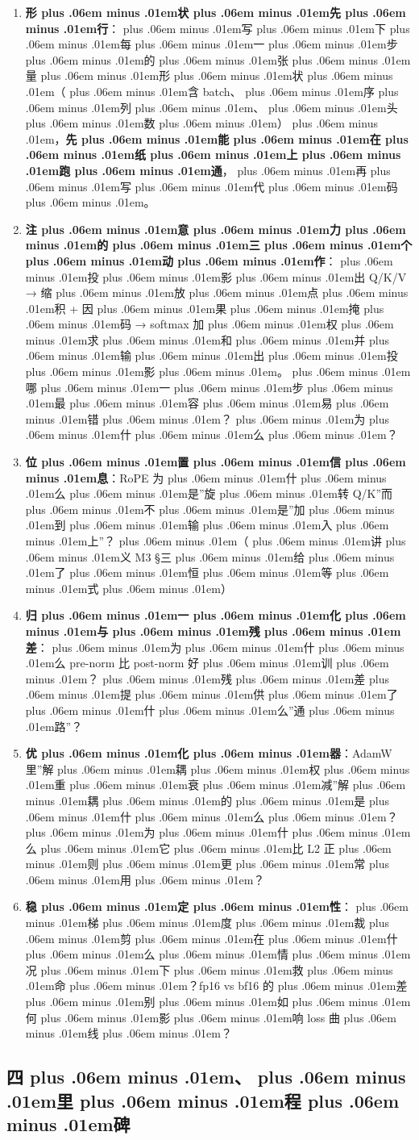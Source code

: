 \documentclass[
]{article}
\providecommand{\tightlist}{%
  \setlength{\itemsep}{0pt}\setlength{\parskip}{0pt}}
\def\zh#1{{\zhfont #1}}
\def\sym#1{{\symfont #1}}
\def\zhglue{\hskip0pt plus .06em minus .01em}
\begin{document}
\begin{enumerate}
\def\labelenumi{\arabic{enumi}.}
\tightlist
\item
  \textbf{\zh{形\zhglue 状\zhglue 先\zhglue 行}}\zh{：\zhglue 写\zhglue 下\zhglue 每\zhglue 一\zhglue 步\zhglue 的\zhglue 张\zhglue 量\zhglue 形\zhglue 状\zhglue （\zhglue 含} batch\zh{、\zhglue 序\zhglue 列\zhglue 、\zhglue 头\zhglue 数\zhglue ）\zhglue ，}\textbf{\zh{先\zhglue 能\zhglue 在\zhglue 纸\zhglue 上\zhglue 跑\zhglue 通}}\zh{，\zhglue 再\zhglue 写\zhglue 代\zhglue 码\zhglue 。}
\item
  \textbf{\zh{注\zhglue 意\zhglue 力\zhglue 的\zhglue 三\zhglue 个\zhglue 动\zhglue 作}}\zh{：\zhglue 投\zhglue 影\zhglue 出} Q/K/V \sym{→} \zh{缩\zhglue 放\zhglue 点\zhglue 积} + \zh{因\zhglue 果\zhglue 掩\zhglue 码} \sym{→} softmax \zh{加\zhglue 权\zhglue 求\zhglue 和\zhglue 并\zhglue 输\zhglue 出\zhglue 投\zhglue 影\zhglue 。\zhglue 哪\zhglue 一\zhglue 步\zhglue 最\zhglue 容\zhglue 易\zhglue 错\zhglue ？\zhglue 为\zhglue 什\zhglue 么\zhglue ？}
\item
  \textbf{\zh{位\zhglue 置\zhglue 信\zhglue 息}}\zh{：}RoPE \zh{为\zhglue 什\zhglue 么\zhglue 是}''\zh{旋\zhglue 转} Q/K''\zh{而\zhglue 不\zhglue 是}''\zh{加\zhglue 到\zhglue 输\zhglue 入\zhglue 上}''\zh{？\zhglue （\zhglue 讲\zhglue 义} M3 \sym{§}\zh{三\zhglue 给\zhglue 了\zhglue 恒\zhglue 等\zhglue 式\zhglue ）}
\item
  \textbf{\zh{归\zhglue 一\zhglue 化\zhglue 与\zhglue 残\zhglue 差}}\zh{：\zhglue 为\zhglue 什\zhglue 么} pre-norm \zh{比} post-norm \zh{好\zhglue 训\zhglue ？\zhglue 残\zhglue 差\zhglue 提\zhglue 供\zhglue 了\zhglue 什\zhglue 么}''\zh{通\zhglue 路}''\zh{？}
\item
  \textbf{\zh{优\zhglue 化\zhglue 器}}\zh{：}AdamW \zh{里}''\zh{解\zhglue 耦\zhglue 权\zhglue 重\zhglue 衰\zhglue 减}''\zh{解\zhglue 耦\zhglue 的\zhglue 是\zhglue 什\zhglue 么\zhglue ？\zhglue 为\zhglue 什\zhglue 么\zhglue 它\zhglue 比} L2 \zh{正\zhglue 则\zhglue 更\zhglue 常\zhglue 用\zhglue ？}
\item
  \textbf{\zh{稳\zhglue 定\zhglue 性}}\zh{：\zhglue 梯\zhglue 度\zhglue 裁\zhglue 剪\zhglue 在\zhglue 什\zhglue 么\zhglue 情\zhglue 况\zhglue 下\zhglue 救\zhglue 命\zhglue ？}fp16 vs bf16 \zh{的\zhglue 差\zhglue 别\zhglue 如\zhglue 何\zhglue 影\zhglue 响} loss \zh{曲\zhglue 线\zhglue ？}
\end{enumerate}

\subsection{\zh{四\zhglue 、\zhglue 里\zhglue 程\zhglue 碑}}\label{ux56dbux91ccux7a0bux7891}
\end{document}

